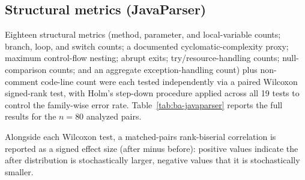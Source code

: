\subsection{Structural metrics (JavaParser)}
\label{sec:before-after-javaparser}

Eighteen structural metrics (method, parameter, and local-variable
counts; branch, loop, and switch counts; a documented
cyclomatic-complexity proxy; maximum control-flow nesting; abrupt exits;
try/resource-handling counts; null-comparison counts; and an aggregate
exception-handling count) plus non-comment code-line count were each
tested independently via a paired Wilcoxon signed-rank test, with Holm's
step-down procedure applied across all 19 tests to control the
family-wise error rate. Table~\ref{tab:ba-javaparser} reports the full
results for the $n=80$ analyzed pairs.

Alongside each Wilcoxon test, a matched-pairs rank-biserial correlation
is reported as a signed effect size (after minus before): positive values
indicate the after distribution is stochastically larger, negative values
that it is stochastically smaller.

